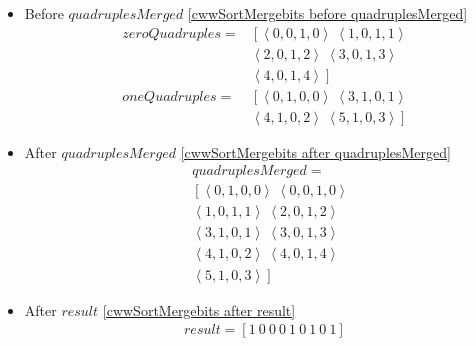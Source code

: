 \begin{frame}[containsverbatim]{\cwwalgortihmexampleframe}
\begin{columns}[c]
\begin{column}{0.65\textwidth}
\begin{multicols}{2}
\begin{itemize}
                            \item Before $quadruplesMerged$ \cref{cwwSortMergebits before quadruplesMerged}
                            \begin{align*}
                                zeroQuadruples = & \left[\left<0, 0, 1, 0\right> \ \left<1, 0, 1, 1\right>\right. \\ 
                                & \left.\left<2, 0, 1, 2\right> \ \left<3, 0, 1, 3\right>\right. \\
                                & \left.\left<4, 0, 1, 4\right>\right] \\
                                oneQuadruples = & \left[\left<0, 1, 0, 0\right> \ \left<3, 1, 0, 1\right>\right. \\ 
                                & \left.\left<4, 1, 0, 2\right> \ \left<5, 1, 0, 3\right>\right]
                            \end{align*}

                            \item After $quadruplesMerged$ \cref{cwwSortMergebits after quadruplesMerged}
                            \begin{align*}
                                & quadruplesMerged = \\
                                & \left[\left<0, 1, 0, 0\right> \ \left<0, 0, 1, 0\right>\right. \\ 
                                & \left.\left<1, 0, 1, 1\right> \ \left<2, 0, 1, 2\right>\right. \\
                                & \left.\left<3, 1, 0, 1\right> \ \left<3, 0, 1, 3\right>\right. \\
                                & \left.\left<4, 1, 0, 2\right> \ \left<4, 0, 1, 4\right>\right. \\
                                & \left.\left<5, 1, 0, 3\right>\right]
                            \end{align*}

                            \item After $result$ \cref{cwwSortMergebits after result}
                            \begin{align*}
                                result = \left[1 \ 0 \ 0 \ 0 \ 1 \ 0 \ 1 \ 0 \ 1\right]
                            \end{align*}
                        \end{itemize}
                    \end{multicols}
                \end{column}
            \end{columns}
        \end{frame}

